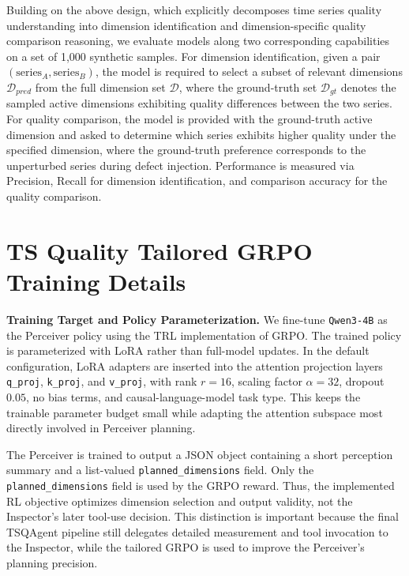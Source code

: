 \documentclass{article}
\begin{document}
Building on the above design, which explicitly decomposes time series quality understanding into dimension identification and dimension-specific quality comparison reasoning, we evaluate models along two corresponding capabilities on a set of 1,000 synthetic samples. 
For dimension identification, given a pair $(\mathrm{series}_A, \mathrm{series}_B)$, the model is required to select a subset of relevant dimensions $\mathcal{D}_{pred}$ from the full dimension set $\mathcal{D}$, where the ground-truth set $\mathcal{D}_{gt}$ denotes the sampled active dimensions exhibiting quality differences between the two series.
For quality comparison, the model is provided with the ground-truth active dimension and asked to determine which series exhibits higher quality under the specified dimension, where the ground-truth preference corresponds to the unperturbed series during defect injection. 
Performance is measured via Precision, Recall for dimension identification, and comparison accuracy for the quality comparison.




\section{TS Quality Tailored GRPO Training Details}
\label{app:grpo}

\textbf{Training Target and Policy Parameterization.} We fine-tune \texttt{Qwen3-4B} as the Perceiver policy using the TRL implementation of GRPO. The trained policy is parameterized with LoRA rather than full-model updates. In the default configuration, LoRA adapters are inserted into the attention projection layers \texttt{q\_proj}, \texttt{k\_proj}, and \texttt{v\_proj}, with rank $r=16$, scaling factor $\alpha=32$, dropout $0.05$, no bias terms, and causal-language-model task type. This keeps the trainable parameter budget small while adapting the attention subspace most directly involved in Perceiver planning.

The Perceiver is trained to output a JSON object containing a short perception summary and a list-valued \texttt{planned\_dimensions} field. Only the \texttt{planned\_dimensions} field is used by the GRPO reward. Thus, the implemented RL objective optimizes dimension selection and output validity, not the Inspector's later tool-use decision. This distinction is important because the final TSQAgent pipeline still delegates detailed measurement and tool invocation to the Inspector, while the tailored GRPO is used to improve the Perceiver's planning precision.
\end{document}

